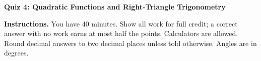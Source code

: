 \documentclass[11pt,addpoints]{exam}
\begin{document}
\begin{center}
  {\Large\bfseries Quiz 4: Quadratic Functions and Right-Triangle Trigonometry}\\[8pt]
  \qquad
\end{center}

\vspace{4pt}
\noindent\textbf{Instructions.} You have 40 minutes. Show all work for full credit; a correct answer with no work earns at most half the points. Calculators are allowed. Round decimal answers to two decimal places unless told otherwise. Angles are in degrees.

\begin{center}
  \gradetable[h][questions]
\end{center}
\end{document}
